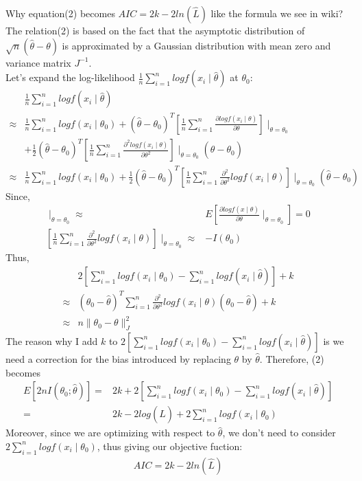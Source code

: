 \documentclass{article}
\begin{document}
Why equation(2) becomes $AIC=2k-2ln(\hat{L})$ like the formula we see in wiki?\\
The relation(2) is based on the fact that the asymptotic distribution of $\sqrt{n}(\hat{\theta}-\theta)$ is approximated by a Gaussian distribution with mean zero and variance matrix $J^{-1}$.\\
Let's expand the log-likelihood $\frac{1}{n}\sum_{i=1}^n log f(x_i\mid \hat{\theta})$ at $\theta_0$:
\begin{align*}
&\frac{1}{n}\sum_{i=1}^n log f(x_i\mid \hat{\theta})\\ \approx &\frac{1}{n}\sum_{i=1}^n log f(x_i\mid \theta_0)+(\hat{\theta}-\theta_0)^T[\frac{1}{n}\sum_{i=1}^n \frac{\partial log f(x_i\mid \theta)}{\partial \theta}]\mid_{\theta=\theta_0}\\&+\frac{1}{2}(\hat{\theta}-\theta_0)^T[\frac{1}{n}\sum_{i=1}^n \frac{\partial^2 log f(x_i\mid \theta)}{\partial \theta^2}]\mid_{\theta=\theta_0}(\hat{\theta}-\theta_0)\\ \approx&\frac{1}{n}\sum_{i=1}^n log f(x_i\mid \theta_0)+\frac{1}{2}(\hat{\theta}-\theta_0)^T[\frac{1}{n}\sum_{i=1}^n \frac{\partial^2 }{\partial \theta^2} log f(x_i\mid \theta)]\mid_{\theta=\theta_0}(\hat{\theta}-\theta_0)
\end{align*}
Since,
\begin{align*}
[\frac{1}{n}\sum_{i=1}^n \frac{\partial log f(x_i\mid \theta)}{\partial \theta}]\mid_{\theta=\theta_0}\approx &E[\frac{\partial log f(x\mid \theta)}{\partial \theta}\mid_{\theta=\theta_0}]=0\\
[\frac{1}{n}\sum_{i=1}^n \frac{\partial^2 }{\partial \theta^2} log f(x_i\mid \theta)]\mid_{\theta=\theta_0}\approx &-I(\theta_0)
\end{align*}
Thus,
\begin{align*}
&2[\sum_{i=1}^n log f(x_i\mid \theta_0)-\sum_{i=1}^n log f(x_i\mid \hat{\theta})]+k\\ \approx &(\theta_0-\hat{\theta})^T\sum_{i=1}^n \frac{\partial^2 }{\partial \theta^2} log f(x_i\mid \theta)(\theta_0-\hat{\theta})+k\\ \approx&n\parallel \theta_0-\theta \parallel _J^2
\end{align*}
The reason why I add $k$ to $2[\sum_{i=1}^n log f(x_i\mid \theta_0)-\sum_{i=1}^n log f(x_i\mid \hat{\theta})]$ is we need a correction for the bias introduced by replacing $\theta$ by $\hat{\theta}$.
Therefore, (2) becomes
\begin{align*}
E[2n I(\theta_0;\hat{\theta})]=&2k+2[\sum_{i=1}^n log f(x_i\mid \theta_0)-\sum_{i=1}^n log f(x_i\mid \hat{\theta})]\\=&2k-2log(\hat{L})+2\sum_{i=1}^n log f(x_i\mid \theta_0)
\end{align*}
Moreover, since we are optimizing with respect to $\hat{\theta}$, we don't need to consider $2\sum_{i=1}^n log f(x_i\mid \theta_0)$, thus giving our objective fuction:
\begin{align}
AIC=2k-2ln(\hat{L})
\end{align}
\end{document}
